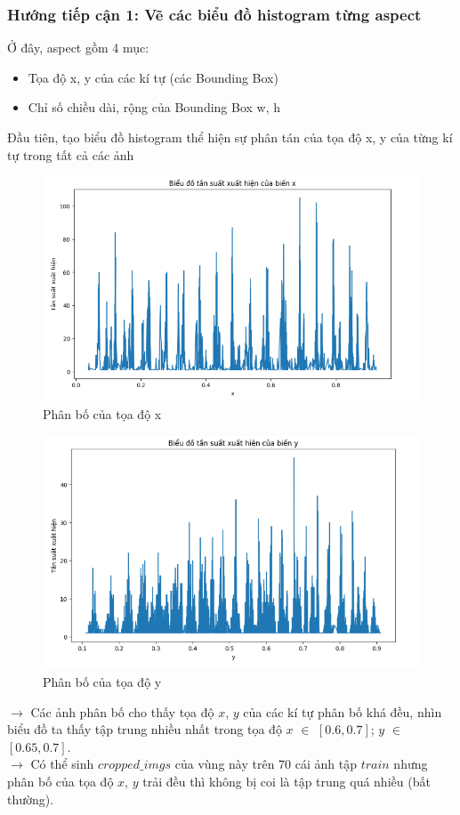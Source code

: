 \documentclass[a4paper,12pt]{article}
\begin{document}
\subsubsection{Hướng tiếp cận 1: Vẽ các biểu đồ histogram từng aspect}
Ở đây, aspect gồm 4 mục:
\begin{itemize}
    \item Tọa độ x, y của các kí tự (các Bounding Box)
    \item Chỉ số chiều dài, rộng của Bounding Box w, h
\end{itemize}
Đầu tiên, tạo biểu đồ histogram thể hiện sự phân tán của tọa độ x, y của từng kí tự trong tất cả các ảnh 
\\
\begin{figure}[ht]
    \centering
    \includegraphics[width=1\linewidth]{images/HistoX_dis_train.png}
    \caption{Phân bố của tọa độ x}
\end{figure}
\begin{figure}[ht]
    \centering
    \includegraphics[width=1\linewidth]{images/HistoY_dis_train.png}
    \caption{Phân bố của tọa độ y}
\end{figure}
$\rightarrow$ Các ảnh phân bố cho thấy tọa độ $x$, $y$ của các kí tự phân bố khá đều, nhìn biểu đồ ta thấy tập trung nhiều nhất trong tọa độ $x$ $\in$ $[0.6, 0.7]$; $y$ $\in$ $[0.65, 0.7]$.
\\
$\rightarrow$ Có thể sinh $cropped\_imgs$ của vùng này trên $70$ cái ảnh tập $train$ nhưng phân bố của tọa độ $x$, $y$ trải đều thì không bị coi là tập trung quá nhiều (bất thường).
\end{document}
